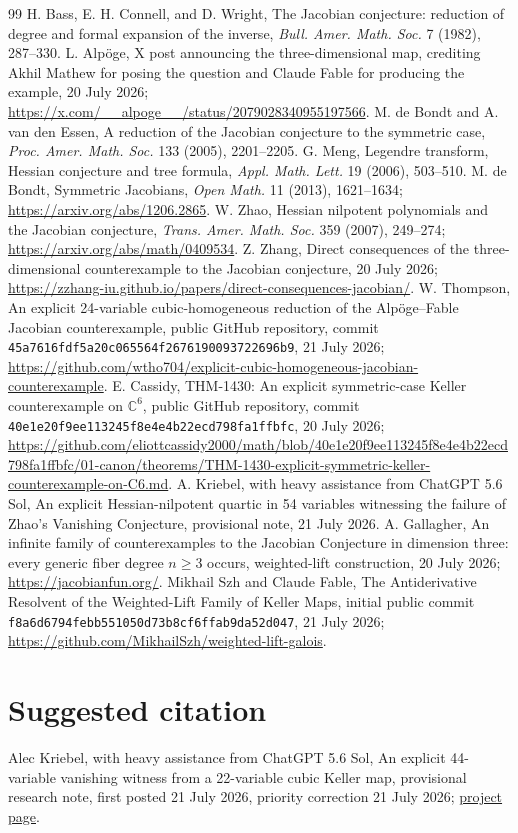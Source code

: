 \documentclass[11pt]{article}
\newcommand{\C}{\mathbb C}
\begin{document}
\begin{thebibliography}{99}
H. Bass, E. H. Connell, and D. Wright, The Jacobian conjecture: reduction of
degree and formal expansion of the inverse, \emph{Bull. Amer. Math. Soc.} 7
(1982), 287--330.
L. Alp\"oge, X post announcing the three-dimensional map, crediting Akhil
Mathew for posing the question and Claude Fable for producing the example,
20 July 2026;
\url{https://x.com/__alpoge__/status/2079028340955197566}.
M. de Bondt and A. van den Essen, A reduction of the Jacobian conjecture to
the symmetric case, \emph{Proc. Amer. Math. Soc.} 133 (2005), 2201--2205.
G. Meng, Legendre transform, Hessian conjecture and tree formula,
\emph{Appl. Math. Lett.} 19 (2006), 503--510.
M. de Bondt, Symmetric Jacobians, \emph{Open Math.} 11 (2013), 1621--1634;
\url{https://arxiv.org/abs/1206.2865}.
W. Zhao, Hessian nilpotent polynomials and the Jacobian conjecture,
\emph{Trans. Amer. Math. Soc.} 359 (2007), 249--274;
\url{https://arxiv.org/abs/math/0409534}.
Z. Zhang, Direct consequences of the three-dimensional counterexample to the
Jacobian conjecture, 20 July 2026;
\url{https://zzhang-iu.github.io/papers/direct-consequences-jacobian/}.
W. Thompson, An explicit 24-variable cubic-homogeneous reduction of the
Alp\"oge--Fable Jacobian counterexample, public GitHub repository, commit
\texttt{45a7616fdf5a20c065564f2676190093722696b9}, 21 July 2026;
\url{https://github.com/wtho704/explicit-cubic-homogeneous-jacobian-counterexample}.
E. Cassidy, THM-1430: An explicit symmetric-case Keller counterexample on
$\C^6$, public GitHub repository, commit
\texttt{40e1e20f9ee113245f8e4e4b22ecd798fa1ffbfc}, 20 July 2026;
\url{https://github.com/eliottcassidy2000/math/blob/40e1e20f9ee113245f8e4e4b22ecd798fa1ffbfc/01-canon/theorems/THM-1430-explicit-symmetric-keller-counterexample-on-C6.md}.
A. Kriebel, with heavy assistance from ChatGPT 5.6 Sol, An explicit
Hessian-nilpotent quartic in 54 variables witnessing the failure of Zhao's
Vanishing Conjecture, provisional note, 21 July 2026.
A. Gallagher, An infinite family of counterexamples to the Jacobian
Conjecture in dimension three: every generic fiber degree $n\ge3$ occurs,
weighted-lift construction, 20 July 2026;
\url{https://jacobianfun.org/}.
Mikhail Szh and Claude Fable, The Antiderivative Resolvent of the Weighted-Lift
Family of Keller Maps, initial public commit
\texttt{f8a6d6794febb551050d73b8cf6ffab9da52d047}, 21 July 2026;
\url{https://github.com/MikhailSzh/weighted-lift-galois}.
\end{thebibliography}

\section*{Suggested citation}
\noindent Alec Kriebel, with heavy assistance from ChatGPT 5.6 Sol,
An explicit 44-variable vanishing witness from a 22-variable cubic Keller map,
provisional research note, first posted 21 July 2026, priority correction
21 July 2026; \href{https://aleckriebel.github.io/Math/papers/symmetric-keller-and-vanishing/}{project page}.
\end{document}
